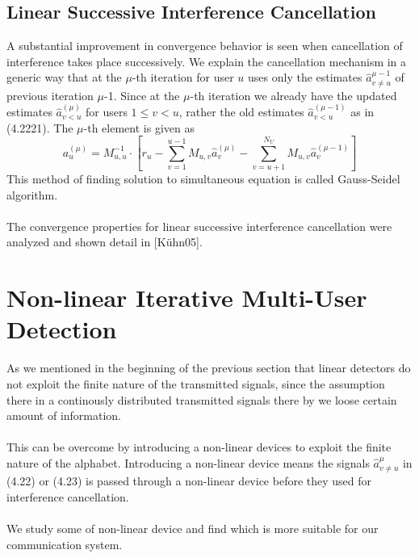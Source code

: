 \subsection{Linear Successive Interference Cancellation}
A substantial improvement in convergence behavior is seen when cancellation of interference takes place successively. We explain the cancellation mechanism in a generic way that at the $\mu$-th iteration for user $u$ uses only the estimates $\hat{a}_{v\ne u}^{\mu-1}$ of previous iteration $\mu$-1. Since at the $\mu$-th iteration we already have the updated estimates $\hat{a}_{v<u}^{(\mu)}$ for users $1\leq v < u$, rather the old estimates $\hat{a}_{v<u}^{(\mu-1)}$ as in (4.2221).  The $\mu$-th element is given as 
\begin{equation}
a_u^{(\mu)}=M_{u,u}^{-1}\cdot \left[r_u-\sum\limits_{v=1}^{u-1}M_{u,v}\hat{a}_v^{(\mu)}-\sum\limits_{v=u+1}^{N_U}M_{u,v}\hat{a}_v^{(\mu-1)}\right]
\end{equation}
This method of finding solution to simultaneous equation is called Gauss-Seidel algorithm.\\ \\
The convergence properties for linear successive interference cancellation were analyzed and shown detail in [K\"uhn05].
\section{Non-linear Iterative Multi-User Detection}
As we mentioned in the beginning of the previous section that linear detectors do not exploit the finite nature of the transmitted signals, since the assumption there in a continously distributed transmitted signals there by we loose certain amount of information. \\ \\
This can be overcome by introducing a non-linear devices to exploit the finite nature of the alphabet. Introducing a non-linear device means the signals $\hat{a}_{v\ne u}^{\mu}$ in (4.22) or (4.23) is passed through a non-linear device before they used for interference cancellation. \\ \\
We study some of non-linear device and find which is more suitable for our communication system.
